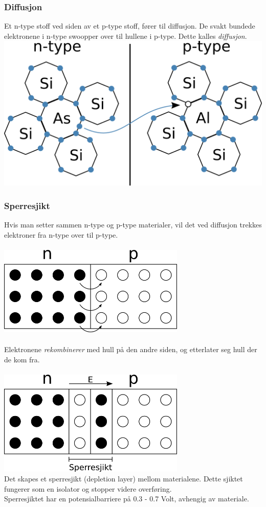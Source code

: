 \subsubsection{Diffusjon}
Et n-type stoff ved siden av et p-type stoff, fører til diffusjon.
De svakt bundede elektronene i n-type swoopper over
til hullene i p-type.
Dette kalles \emph{diffusjon}.
\\
\includegraphics[width=\textwidth]{./img/krystall-pn}

\subsubsection{Sperresjikt}
Hvis man setter sammen n-type og p-type materialer,
vil det ved diffusjon trekkes elektroner
fra n-type over til p-type.
\\\\
\includegraphics[width=0.67\textwidth]{./img/pn-junction}
\\\\
Elektronene \emph{rekombinerer} med hull på den andre siden,
og etterlater seg hull der de kom fra.
\\\\
\includegraphics[width=0.67\textwidth]{./img/pn-sperresjikt}
\\
Det skapes et sperresjikt (depletion layer) mellom materialene.
Dette sjiktet fungerer som en isolator og stopper videre overføring.
\\
Sperresjiktet har en potensialbarriere på 0.3 - 0.7 Volt,
avhengig av materiale.

